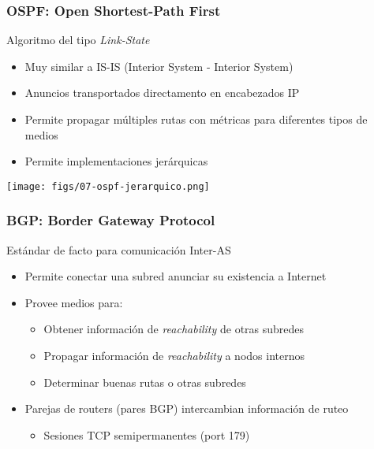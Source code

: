 \documentclass[letter]{beamer}
\begin{document}
\begin{frame}
  \frametitle{OSPF: Open Shortest-Path First}

  Algoritmo del tipo {\em Link-State}
  \begin{itemize}
    \item Muy similar a IS-IS (Interior System - Interior System)
    \item Anuncios transportados directamento en encabezados IP
    \item Permite propagar múltiples rutas con métricas para diferentes
          tipos de medios
    \item Permite implementaciones jerárquicas
  \end{itemize}

  \begin{center}
    \texttt{[image: figs/07-ospf-jerarquico.png]}
  \end{center}

\end{frame}
\begin{frame}
  \frametitle{BGP: Border Gateway Protocol}

  Estándar de facto para comunicación Inter-AS
  \begin{itemize}
    \item Permite conectar una subred anunciar su existencia a Internet
    \item Provee medios para:
      \begin{itemize}
        \item Obtener información de {\em reachability} de otras subredes
        \item Propagar información de {\em reachability} a nodos internos
        \item Determinar buenas rutas o otras subredes
      \end{itemize}
    \item Parejas de routers (pares BGP) intercambian información de ruteo
      \begin{itemize}
        \item Sesiones TCP semipermanentes (port 179)
      \end{itemize}
  \end{itemize}
\end{frame}
\end{document}
